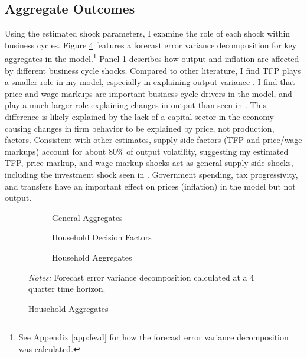 \subsection{Aggregate Outcomes}

Using the estimated shock parameters, I examine the role of each shock within business cycles. Figure \ref{fig:agg-var-decomp} features a forecast error variance decomposition for key aggregates in the model.\footnote{See Appendix \ref{app:fevd} for how the forecast error variance decomposition was calculated.} Panel \ref{subfig:gen-aggs} describes how output and inflation are affected by different business cycle shocks. Compared to other literature, I find TFP plays a smaller role in my model, especially in explaining output variance \autocites{smets2007shocks}{bayer2024shocks}. I find that price and wage markups are important business cycle drivers in the model, and play a much larger role explaining changes in output than seen in \textcite{bayer2024shocks}. This difference is likely explained by the lack of a capital sector in the economy causing changes in firm behavior to be explained by price, not production, factors. Consistent with other estimates, supply-side factors (TFP and price/wage markups) account for about 80\% of output volatility, suggesting my estimated TFP, price markup, and wage markup shocks act as general supply side shocks, including the investment shock seen in \textcite{bayer2024shocks}. Government spending, tax progressivity, and transfers have an important effect on prices (inflation) in the model but not output.

\begin{figure}[t]
    \centering
    \caption{Variance Decomposition: Aggregates}
    \begin{subfigure}[t]{\textwidth}
        \centering
        \caption{General Aggregates}
        
        \label{subfig:gen-aggs}
    \end{subfigure}
    \begin{subfigure}[t]{\textwidth}
        \centering
        \caption{Household Decision Factors}
        
        \label{subfig:hh-dec-aggs}
    \end{subfigure}
    \begin{subfigure}[t]{\textwidth}
        \centering
        \caption{Household Aggregates}
        
        \label{subfig:hh-agg-aggs}
    \end{subfigure}
    {\scriptsize \textit{Notes:} Forecast error variance decomposition calculated at a 4 quarter time horizon.}
    \label{fig:agg-var-decomp}
\end{figure}

